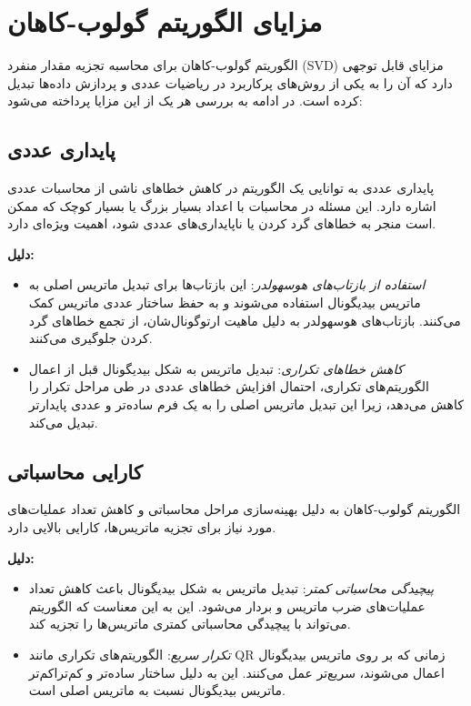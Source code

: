\section{مزایای الگوریتم گولوب-کاهان}

الگوریتم گولوب-کاهان برای محاسبه تجزیه مقدار منفرد (SVD) مزایای قابل توجهی دارد که آن را به یکی از روش‌های پرکاربرد در ریاضیات عددی و پردازش داده‌ها تبدیل کرده است. در ادامه به بررسی هر یک از این مزایا پرداخته می‌شود:

\subsection{پایداری عددی}

پایداری عددی به توانایی یک الگوریتم در کاهش خطاهای ناشی از محاسبات عددی اشاره دارد. این مسئله در محاسبات با اعداد بسیار بزرگ یا بسیار کوچک که ممکن است منجر به خطاهای گرد کردن یا ناپایداری‌های عددی شود، اهمیت ویژه‌ای دارد.

\textbf{دلیل:}

\begin{itemize}
  \item \textit{استفاده از بازتاب‌های هوسهولدر}: این بازتاب‌ها برای تبدیل ماتریس اصلی به ماتریس بیدیگونال استفاده می‌شوند و به حفظ ساختار عددی ماتریس کمک می‌کنند. بازتاب‌های هوسهولدر به دلیل ماهیت ارتوگونال‌شان، از تجمع خطاهای گرد کردن جلوگیری می‌کنند.
  \item \textit{کاهش خطاهای تکراری}: تبدیل ماتریس به شکل بیدیگونال قبل از اعمال الگوریتم‌های تکراری، احتمال افزایش خطاهای عددی در طی مراحل تکرار را کاهش می‌دهد، زیرا این تبدیل ماتریس اصلی را به یک فرم ساده‌تر و عددی پایدارتر تبدیل می‌کند.
\end{itemize}

\subsection{کارایی محاسباتی}

الگوریتم گولوب-کاهان به دلیل بهینه‌سازی مراحل محاسباتی و کاهش تعداد عملیات‌های مورد نیاز برای تجزیه ماتریس‌ها، کارایی بالایی دارد.

\textbf{دلیل:}

\begin{itemize}
  \item \textit{پیچیدگی محاسباتی کمتر}: تبدیل ماتریس به شکل بیدیگونال باعث کاهش تعداد عملیات‌های ضرب ماتریس و بردار می‌شود. این به این معناست که الگوریتم می‌تواند با پیچیدگی محاسباتی کمتری ماتریس‌ها را تجزیه کند.
  \item \textit{تکرار سریع}: الگوریتم‌های تکراری مانند QR زمانی که بر روی ماتریس بیدیگونال اعمال می‌شوند، سریع‌تر عمل می‌کنند. این به دلیل ساختار ساده‌تر و کم‌تراکم‌تر ماتریس بیدیگونال نسبت به ماتریس اصلی است.
\end{itemize}

